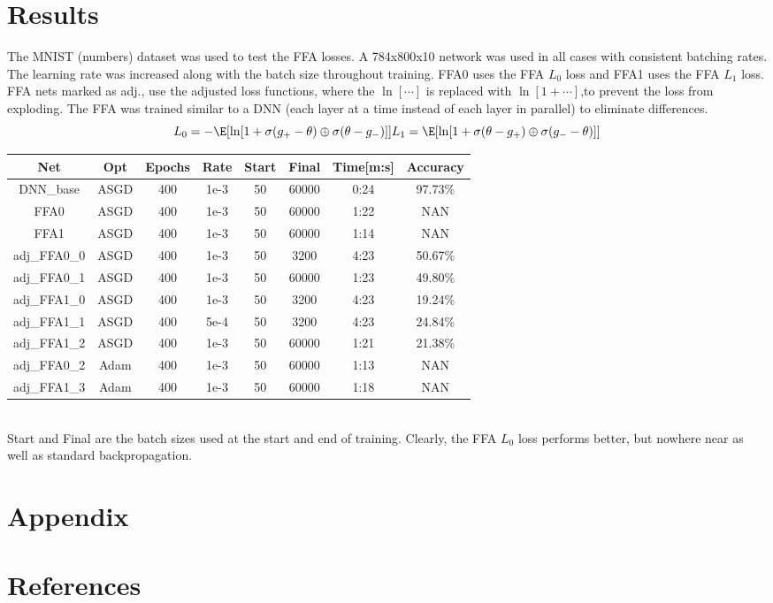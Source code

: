 \section{Results}
The MNIST (numbers) dataset \cite{MNIST} was used to test the FFA losses.
A 784x800x10 network was used in all cases with consistent batching rates.
The learning rate was increased along with the batch size throughout training.
FFA0 uses the FFA $L_0$ loss and FFA1 uses the FFA $L_1$ loss.
FFA nets marked as adj., use the adjusted loss functions, where the $\ln[\cdots]$ is replaced with $\ln[1 + \cdots]$,to prevent the loss from exploding.
The FFA was trained similar to a DNN (each layer at a time instead of each layer in parallel) to eliminate differences.
\[
L_0 = -\E[\ln[1 + \sigma(g_+-\theta)\oplus\sigma(\theta-g_-)]] \\
L_1 = \E[\ln[1 + \sigma(\theta-g_+)\oplus\sigma(g_--\theta)]]
\]
\begin{tabular}{ c|c c c c c|c c}
Net & Opt & Epochs & Rate & Start & Final & Time[m:s] & Accuracy \\
\hline
DNN\_base   & ASGD & 400 & 1e-3 & 50 & 60000 & 0:24 & 97.73\% \\
FFA0       & ASGD & 400 & 1e-3 & 50 & 60000 & 1:22 & NAN \\
FFA1       & ASGD & 400 & 1e-3 & 50 & 60000 & 1:14 & NAN \\
adj\_FFA0\_0 & ASGD & 400 & 1e-3 & 50 & 3200 & 4:23 & 50.67\% \\
adj\_FFA0\_1 & ASGD & 400 & 1e-3 & 50 & 60000 & 1:23 & 49.80\% \\
adj\_FFA1\_0 & ASGD & 400 & 1e-3 & 50 & 3200 & 4:23 & 19.24\% \\
adj\_FFA1\_1 & ASGD & 400 & 5e-4 & 50 & 3200 & 4:23 & 24.84\% \\
adj\_FFA1\_2 & ASGD & 400 & 1e-3 & 50 & 60000 & 1:21 & 21.38\% \\
adj\_FFA0\_2 & Adam & 400 & 1e-3 & 50 & 60000 & 1:13 & NAN \\
adj\_FFA1\_3 & Adam & 400 & 1e-3 & 50 & 60000 & 1:18 & NAN \\
\end{tabular} \\



Start and Final are the batch sizes used at the start and end of training.
Clearly, the FFA $L_0$ loss performs better, but nowhere near as well as standard backpropagation.\\

\section{Appendix}


\section{References}

